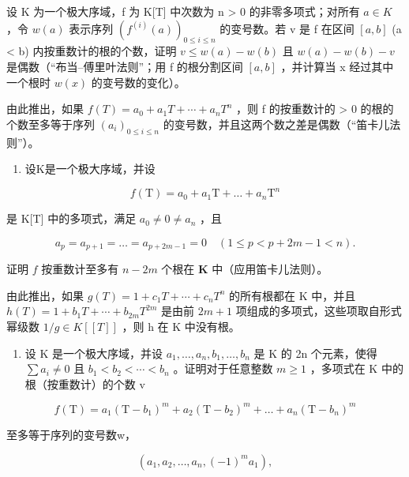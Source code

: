 设 K 为一个极大序域，f 为 K{[}T{]} 中次数为 n \textgreater{} 0 的非零多项式；对所有 \(a \in K\) ，令 \(w(a)\) 表示序列 \((f^{(i)}(a))_{0 \leq i \leq n}\) 的变号数。若 v 是 f 在区间 \([a, b]\) (a \textless{} b) 内按重数计的根的个数，证明 \(v \leq w(a) - w(b)\) 且 \(w(a) - w(b) - v\) 是偶数（“布当–傅里叶法则”；用 f 的根分割区间 \([a, b]\) ，并计算当 x 经过其中一个根时 \(w(x)\) 的变号数的变化）。

由此推出，如果 \(f(T) = a_{0} + a_{1}T + \cdots + a_{n}T^{n}\) ，则 f 的按重数计的 \textgreater{} 0 的根的个数至多等于序列 \((a_{i})_{0 \leq i \leq n}\) 的变号数，并且这两个数之差是偶数（“笛卡儿法则”）。

\begin{enumerate}
\def\labelenumi{\arabic{enumi})}
\setcounter{enumi}{21}
\tightlist
\item
  设K是一个极大序域，并设
\end{enumerate}

\[
f (\mathrm{T}) = a _ {0} + a _ {1} \mathrm{T} + \dots + a _ {n} \mathrm{T} ^ {n}
\]

是 K{[}T{]} 中的多项式，满足 \(a_0 \neq 0 \neq a_n\) ，且

\[
a _ {p} = a _ {p + 1} = \dots = a _ {p + 2 m - 1} = 0 \quad (1 \leqslant p <   p + 2 m - 1 <   n).
\]

证明 \(f\) 按重数计至多有 \(n - 2m\) 个根在 \(\mathbf{K}\) 中（应用笛卡儿法则）。

由此推出，如果 \(g(T) = 1 + c_{1}T + \cdots + c_{n}T^{n}\) 的所有根都在 K 中，并且 \(h(T) = 1 + b_{1}T + \cdots + b_{2m}T^{2m}\) 是由前 \(2m + 1\) 项组成的多项式，这些项取自形式幂级数 \(1/g \in K[[T]]\) ，则 h 在 K 中没有根。

\begin{enumerate}
\def\labelenumi{\arabic{enumi})}
\setcounter{enumi}{22}
\tightlist
\item
  设 K 是一个极大序域，并设 \(a_{1}, \ldots, a_{n}, b_{1}, \ldots, b_{n}\) 是 K 的 2n 个元素，使得 \(\sum a_{i} \neq 0\) 且 \(b_{1} < b_{2} < \cdots < b_{n}\) 。证明对于任意整数 \(m \geqslant 1\) ，多项式在 K 中的根（按重数计）的个数 v
\end{enumerate}

\[
f (\mathrm{T}) = a _ {1} \left(\mathrm{T} - b _ {1}\right) ^ {m} + a _ {2} \left(\mathrm{T} - b _ {2}\right) ^ {m} + \dots + a _ {n} \left(\mathrm{T} - b _ {n}\right) ^ {m}
\]

至多等于序列的变号数w，

\[
\left(a _ {1}, a _ {2}, \dots , a _ {n}, (- 1) ^ {m} a _ {1}\right),
\]

